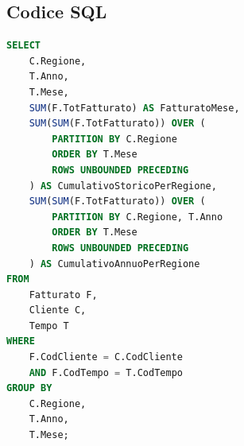 \subsection{Codice SQL}
\begin{lstlisting}[language=SQL, basicstyle=\ttfamily\small, keywordstyle=\color{blue}, stringstyle=\color{red}, commentstyle=\color{green!60!black}]
SELECT 
    C.Regione,
    T.Anno,
    T.Mese,
    SUM(F.TotFatturato) AS FatturatoMese,
    SUM(SUM(F.TotFatturato)) OVER (
        PARTITION BY C.Regione
        ORDER BY T.Mese
        ROWS UNBOUNDED PRECEDING
    ) AS CumulativoStoricoPerRegione,
    SUM(SUM(F.TotFatturato)) OVER (
        PARTITION BY C.Regione, T.Anno
        ORDER BY T.Mese
        ROWS UNBOUNDED PRECEDING
    ) AS CumulativoAnnuoPerRegione
FROM 
    Fatturato F, 
    Cliente C, 
    Tempo T
WHERE 
    F.CodCliente = C.CodCliente
    AND F.CodTempo = T.CodTempo
GROUP BY 
    C.Regione, 
    T.Anno, 
    T.Mese;
\end{lstlisting}

